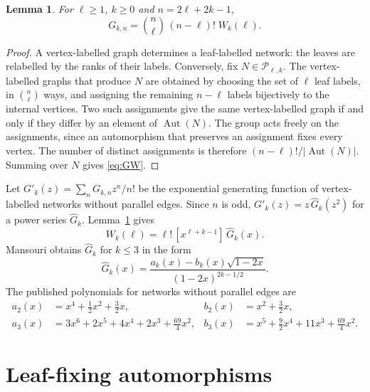 \documentclass[11pt,a4paper]{article}
\newtheorem{lemma}[theorem]{Lemma}
\theoremstyle{definition}
\newcommand{\Aut}{\operatorname{Aut}}
\newcommand{\cP}{\mathcal{P}}
\begin{document}
\begin{lemma}\label{lem:vertexlabelled}
For $\ell\ge1$, $k\ge0$ and $n=2\ell+2k-1$,
\begin{equation}\label{eq:GW}
G_{k,n}=\binom{n}{\ell}\,(n-\ell)!\;W_k(\ell).
\end{equation}
\end{lemma}

\begin{proof}
A vertex-labelled graph determines a leaf-labelled network: the leaves are relabelled by the ranks of their labels. Conversely, fix $N\in\cP_{\ell,k}$. The vertex-labelled graphs that produce $N$ are obtained by choosing the set of $\ell$ leaf labels, in $\binom{n}{\ell}$ ways, and assigning the remaining $n-\ell$ labels bijectively to the internal vertices. Two such assignments give the same vertex-labelled graph if and only if they differ by an element of $\Aut(N)$. The group acts freely on the assignments, since an automorphism that preserves an assignment fixes every vertex. The number of distinct assignments is therefore $(n-\ell)!/|\Aut(N)|$. Summing over $N$ gives \eqref{eq:GW}.
\end{proof}

Let $G'_k(z)=\sum_n G_{k,n}z^n/n!$ be the exponential generating function of vertex-labelled networks without parallel edges. Since $n$ is odd, $G'_k(z)=z\,\widehat G_k(z^2)$ for a power series $\widehat G_k$. Lemma~\ref{lem:vertexlabelled} gives
\begin{equation}\label{eq:WfromG}
W_k(\ell)=\ell!\,[x^{\ell+k-1}]\,\widehat G_k(x).
\end{equation}
Mansouri \cite{Mansouri22} obtains $\widehat G_k$ for $k\le3$ in the form
\begin{equation}\label{eq:Mform}
\widehat G_k(x)=\frac{a_k(x)-b_k(x)\sqrt{1-2x}}{(1-2x)^{2k-1/2}}.
\end{equation}
The published polynomials for networks without parallel edges are
\begin{align}
a_2(x)&=x^4+\tfrac12x^2+\tfrac32x, & b_2(x)&=x^2+\tfrac32x, \label{eq:M2}\\
a_3(x)&=3x^6+2x^5+4x^4+2x^3+\tfrac{69}{4}x^2, & b_3(x)&=x^5+\tfrac92x^4+11x^3+\tfrac{69}{4}x^2. \label{eq:M3}
\end{align}


\section{Leaf-fixing automorphisms}\label{sec:aut}
\end{document}
